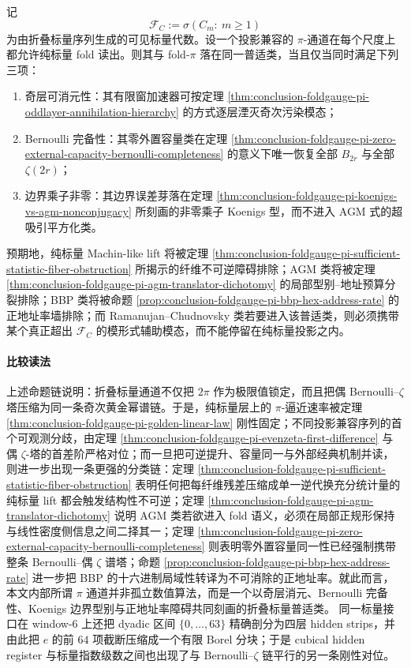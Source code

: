 \begin{conjecture}\label{conj:conclusion-foldgauge-modular-acceleration-measurability}
记
\[
\mathscr F_C:=\sigma(C_m:\ m\ge 1)
\]
为由折叠标量序列生成的可见标量代数。设一个投影兼容的 \(\pi\)-通道在每个尺度上都允许纯标量 fold 读出。则其与 fold-\(\pi\) 落在同一普适类，当且仅当同时满足下列三项：
\begin{enumerate}
  \item 奇层可消元性：其有限窗加速器可按定理 \ref{thm:conclusion-foldgauge-pi-oddlayer-annihilation-hierarchy} 的方式逐层湮灭奇次污染模态；
  \item Bernoulli 完备性：其零外置容量类在定理 \ref{thm:conclusion-foldgauge-pi-zero-external-capacity-bernoulli-completeness} 的意义下唯一恢复全部 \(B_{2r}\) 与全部 \(\zeta(2r)\)；
  \item 边界乘子非零：其边界误差芽落在定理 \ref{thm:conclusion-foldgauge-pi-koenigs-vs-agm-nonconjugacy} 所刻画的非零乘子 Koenigs 型，而不进入 AGM 式的超吸引平方化类。
\end{enumerate}
预期地，纯标量 Machin-like lift 将被定理 \ref{thm:conclusion-foldgauge-pi-sufficient-statistic-fiber-obstruction} 所揭示的纤维不可逆障碍排除；AGM 类将被定理 \ref{thm:conclusion-foldgauge-pi-agm-translator-dichotomy} 的局部型别--地址预算分裂排除；BBP 类将被命题 \ref{prop:conclusion-foldgauge-pi-bbp-hex-address-rate} 的正地址率墙排除；而 Ramanujan--Chudnovsky 类若要进入该普适类，则必须携带某个真正超出 \(\mathscr F_C\) 的模形式辅助模态，而不能停留在纯标量投影之内。
\end{conjecture}

\paragraph{比较读法}
上述命题链说明：折叠标量通道不仅把 \(2\pi\) 作为极限值锁定，而且把偶 Bernoulli--\(\zeta\) 塔压缩为同一条奇次黄金幂谱链。于是，纯标量层上的 \(\pi\)-逼近速率被定理 \ref{thm:conclusion-foldgauge-pi-golden-linear-law} 刚性固定；不同投影兼容序列的首个可观测分歧，由定理 \ref{thm:conclusion-foldgauge-pi-evenzeta-first-difference} 与偶 \(\zeta\)-塔的首差阶严格对位；而一旦把可逆提升、容量同一与外部经典机制并读，则进一步出现一条更强的分类链：定理 \ref{thm:conclusion-foldgauge-pi-sufficient-statistic-fiber-obstruction} 表明任何把每纤维残差压缩成单一逆代换充分统计量的纯标量 lift 都会触发结构性不可逆；定理 \ref{thm:conclusion-foldgauge-pi-agm-translator-dichotomy} 说明 AGM 类若欲进入 fold 语义，必须在局部正规形保持与线性密度侧信息之间二择其一；定理 \ref{thm:conclusion-foldgauge-pi-zero-external-capacity-bernoulli-completeness} 则表明零外置容量同一性已经强制携带整条 Bernoulli--偶 \(\zeta\) 谱塔；命题 \ref{prop:conclusion-foldgauge-pi-bbp-hex-address-rate} 进一步把 BBP 的十六进制局域性转译为不可消除的正地址率。就此而言，本文内部所谓 \(\pi\) 通道并非孤立数值算法，而是一个以奇层消元、Bernoulli 完备性、Koenigs 边界型别与正地址率障碍共同刻画的折叠标量普适类。
同一标量接口在 window-\(6\) 上还把 dyadic 区间 \(\{0,\dots,63\}\) 精确剖分为四层 hidden strips，并由此把 \(e\) 的前 \(64\) 项截断压缩成一个有限 Borel 分块；于是 cubical hidden register 与标量指数级数之间也出现了与 Bernoulli--\(\zeta\) 链平行的另一条刚性对位。

\endinput
